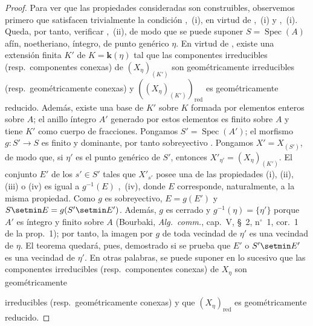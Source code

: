 \begin{proof}
Para ver que las propiedades consideradas son construibles, observemos primero que satisfacen trivialmente la condición ,~(i), en virtud de ,~(i) y ,~(i).
Queda, por tanto, verificar ,~(ii), de modo que se puede suponer $S=\operatorname{Spec}(A)$ afín, noetheriano, íntegro, de punto genérico $\eta$.
En virtud de , existe una extensión finita $K'$ de $K=\boldsymbol{k}(\eta)$ tal que las componentes irreducibles (resp.\ componentes conexas) de $(X_\eta)_{(K')}$ son geométricamente irreducibles (resp.\ geométricamente conexas) y $((X_\eta)_{(K')})_{\mathrm{red}}$ es geométricamente reducido.
Además, existe una base de $K'$ sobre $K$ formada por elementos enteros sobre $A$; el anillo íntegro $A'$ generado por estos elementos es finito sobre $A$ y tiene $K'$ como cuerpo de fracciones.
Pongamos $S'=\operatorname{Spec}(A')$; el morfismo $g:S'\to S$ es finito y dominante, por tanto sobreyectivo . Pongamos $X'=X_{(S')}$, de modo que, si $\eta'$ es el punto genérico de $S'$, entonces $X'_{\eta'}=(X_\eta)_{(K')}$. El conjunto $E'$ de los $s'\in S'$ tales que $X'_{s'}$ posee una de las propiedades (i), (ii), (iii) o (iv) es igual a $g^{-1}(E)$ ,~(iv), donde $E$ corresponde, naturalmente, a la misma propiedad. Como $g$ es sobreyectivo, $E=g(E')$ y $S\setmin E=g(S'\setmin E')$. Además, $g$ es cerrado y $g^{-1}(\eta)=\{\eta'\}$ porque $A'$ es íntegro y finito sobre $A$ (Bourbaki, \emph{Alg.\ comm.}, cap.\ V, \S~2, n$^\circ$~1, cor.\ 1 de la prop.\ 1); por tanto, la imagen por $g$ de toda vecindad de $\eta'$ es una vecindad de $\eta$.
El teorema quedará, pues, demostrado si se prueba que $E'$ o $S'\setmin E'$ es una vecindad de $\eta'$.
En otras palabras, se puede suponer en lo sucesivo que las componentes irreducibles (resp.\ componentes conexas) de $X_\eta$ son geométricamente


irreducibles (resp.\ geométricamente conexas) y que $(X_\eta)_{\mathrm{red}}$ es geométricamente reducido.


\end{proof}
